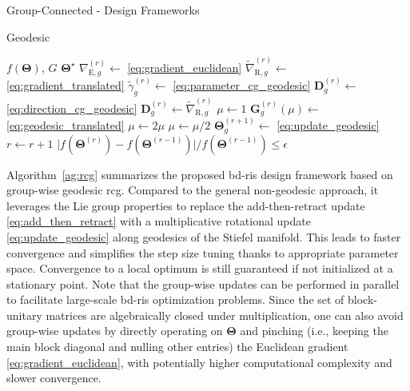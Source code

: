 \documentclass[journal]{IEEEtran}
\makeatletter
\newcommand\setalgorithmcaptionfont[1]{%
	\let\my@floatc@ruled\floatc@ruled          %
	\def\floatc@ruled{%
		\global\let\floatc@ruled\my@floatc@ruled %
		#1\floatc@ruled}}
\makeatother
\begin{document}
\begin{section}{Group-Connected - Design Frameworks}
\begin{subsection}{Geodesic }
		\setalgorithmcaptionfont{\small}
		\begin{algorithm}[!t]
			\small
			\caption{Group-wise geodesic \gls{rcg} for \gls{bd}-\gls{ris} design}
			\label{ag:rcg}
			\begin{algorithmic}[1]
				\Require $f(\mathbf{\Theta})$, $G$
				\Ensure $\mathbf{\Theta}^\star$
				\Repeat
						\State $\nabla_{\mathrm{E},g}^{(r)} \gets$ \eqref{eq:gradient_euclidean} \label{ln:gradient_euclidean}
						\State $\tilde{\nabla}_{\mathrm{R},g}^{(r)} \gets$ \eqref{eq:gradient_translated}
						\State $\tilde{\gamma}_g^{(r)} \gets$ \eqref{eq:parameter_cg_geodesic}
						\State $\mathbf{D}_g^{(r)} \gets$ \eqref{eq:direction_cg_geodesic}
						 
							\State $\mathbf{D}_g^{(r)} \gets \tilde{\nabla}_{\mathrm{R},g}^{(r)}$
						\EndIf
						\State $\mu \gets 1$
						\State $\mathbf{G}_g^{(r)}(\mu) \gets$ \eqref{eq:geodesic_translated}
						 \label{ln:armijo_start}
							\State $\mu \gets 2 \mu$
						\EndWhile
							\State $\mu \gets \mu / 2$
						\EndWhile \label{ln:armijo_end}
						\State $\mathbf{\Theta}_g^{(r+1)} \gets$ \eqref{eq:update_geodesic}
					\EndFor
					\State $r \gets r+1$
				\Until $\lvert f(\mathbf{\Theta}^{(r)}) - f(\mathbf{\Theta}^{(r-1)}) \rvert / f(\mathbf{\Theta}^{(r-1)}) \le \epsilon$
			\end{algorithmic}
		\end{algorithm}

		Algorithm~\ref{ag:rcg} summarizes the proposed \gls{bd}-\gls{ris} design framework based on group-wise geodesic \gls{rcg}.
		Compared to the general non-geodesic approach, it leverages the Lie group properties to replace the add-then-retract update \eqref{eq:add_then_retract} with a multiplicative rotational update \eqref{eq:update_geodesic} along geodesics of the Stiefel manifold.
		This leads to faster convergence and simplifies the step size tuning thanks to appropriate parameter space.
		Convergence to a local optimum is still guaranteed if not initialized at a stationary point.
		Note that the group-wise updates can be performed in parallel to facilitate large-scale \gls{bd}-\gls{ris} optimization problems.
		Since the set of block-unitary matrices are algebraically closed under multiplication, one can also avoid group-wise updates by directly operating on $\mathbf{\Theta}$ and pinching (i.e., keeping the main block diagonal and nulling other entries) the Euclidean gradient \eqref{eq:gradient_euclidean}, with potentially higher computational complexity and slower convergence.
	\end{subsection}
\end{section}
\end{document}
